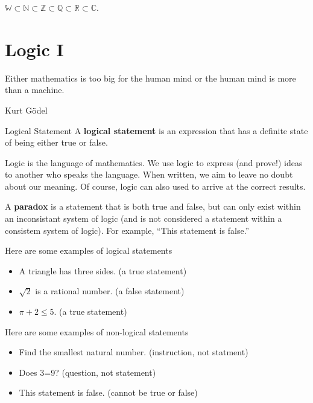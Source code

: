 \begin{boxexample}{}{}
	$\mathbb{W} \subset \mathbb{N} \subset \mathbb{Z} \subset \mathbb{Q} \subset \mathbb{R} \subset \mathbb{C}$.
\end{boxexample}

\chapter{Logic I}

\epigraph{Either mathematics is too big for the human mind or the human mind is more than a machine.}{Kurt Gödel}

\begin{boxdefine}{Logical Statement}{}
A {\bf logical statement} is an expression that has a definite state of being either true or false.
\end{boxdefine}

Logic is the language of mathematics. We use logic to express (and prove!) ideas to another who speaks the language. When written, we aim to leave no doubt about our meaning. Of course, logic can also used to arrive at the correct results.

\begin{boxremark*}{}{}
	A {\bf paradox} is a statement that is both true and false, but can only exist within an inconsistant system of logic (and is not considered a statement within a consistem system of logic). For example, ``This statement is false.''
\end{boxremark*}

\begin{boxexample}{}{}
	Here are some examples of logical statements
	\begin{itemize}
		\item A triangle has three sides. (a true statement)
		\item $\sqrt 2$ is a rational number. (a false statement)
		\item $\pi + 2 \leq 5$. (a true statement)
	\end{itemize}
\end{boxexample}

\begin{boxexample}{}{}
	Here are some examples of non-logical statements
	\begin{itemize}
		\item Find the smallest natural number. (instruction, not statment)
		\item Does 3=9? (question, not statement)
		\item This statement is false. (cannot be true or false)
	\end{itemize}
\end{boxexample}

